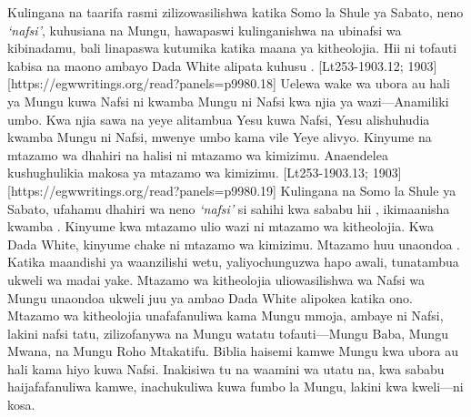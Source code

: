 Kulingana na taarifa rasmi zilizowasilishwa katika Somo la Shule ya Sabato, neno \textit{‘nafsi’},\textit{ }kuhusiana na Mungu, hawapaswi kulinganishwa na ubinafsi wa kibinadamu, bali linapaswa kutumika katika maana ya kitheolojia. Hii ni tofauti kabisa na maono ambayo Dada White alipata kuhusu . [Lt253-1903.12; 1903][https://egwwritings.org/read?panels=p9980.18] Uelewa wake wa ubora au hali ya Mungu kuwa Nafsi ni kwamba Mungu ni Nafsi kwa njia ya wazi—Anamiliki umbo. Kwa njia sawa na yeye alitambua Yesu kuwa Nafsi, Yesu alishuhudia kwamba Mungu ni Nafsi, mwenye umbo kama vile Yeye alivyo. Kinyume na mtazamo wa dhahiri na halisi ni mtazamo wa kimizimu. Anaendelea kushughulikia makosa ya mtazamo wa kimizimu. [Lt253-1903.13; 1903][https://egwwritings.org/read?panels=p9980.19] Kulingana na Somo la Shule ya Sabato, ufahamu dhahiri wa neno \textit{‘nafsi’ }si sahihi kwa sababu hii , ikimaanisha kwamba . Kinyume kwa mtazamo ulio wazi ni mtazamo wa kitheolojia. Kwa Dada White, kinyume chake ni mtazamo wa kimizimu. Mtazamo huu unaondoa . Katika maandishi ya waanzilishi wetu, yaliyochunguzwa hapo awali, tunatambua ukweli wa madai yake. Mtazamo wa kitheolojia uliowasilishwa wa Nafsi wa Mungu unaondoa ukweli juu ya  ambao Dada White alipokea katika ono. Mtazamo wa kitheolojia unafafanuliwa kama Mungu mmoja, ambaye ni Nafsi, lakini nafsi tatu, zilizofanywa na Mungu watatu tofauti—Mungu Baba, Mungu Mwana, na Mungu Roho Mtakatifu. Biblia haisemi kamwe Mungu kwa ubora au hali kama hiyo kuwa Nafsi. Inakisiwa tu na waamini wa utatu na, kwa sababu haijafafanuliwa kamwe, inachukuliwa kuwa fumbo la Mungu, lakini kwa kweli—ni kosa.


